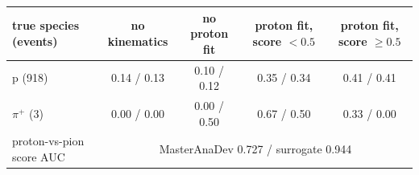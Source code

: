 \begin{tabular}{lcccc}
\toprule
true species (events) & no kinematics & no proton fit & proton fit, score $<0.5$ & proton fit, score $\geq 0.5$ \\
\midrule
p (918) & 0.14 / 0.13 & 0.10 / 0.12 & 0.35 / 0.34 & 0.41 / 0.41 \\
$\pi^+$ (3) & 0.00 / 0.00 & 0.00 / 0.50 & 0.67 / 0.50 & 0.33 / 0.00 \\
\midrule
proton-vs-pion score AUC & \multicolumn{4}{c}{MasterAnaDev 0.727 / surrogate 0.944} \\
\bottomrule
\end{tabular}
